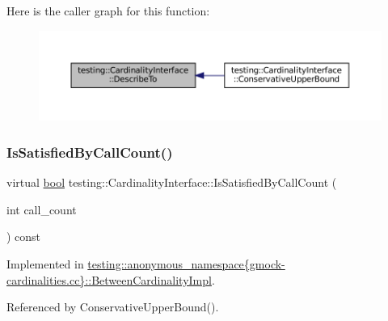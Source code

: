 Here is the caller graph for this function\+:
\nopagebreak
\begin{figure}[H]
\begin{center}
\leavevmode
\includegraphics[width=350pt]{classtesting_1_1CardinalityInterface_a8a93e3bbf24d14fe21186802ecef0929_icgraph}
\end{center}
\end{figure}
\mbox{\label{classtesting_1_1CardinalityInterface_af89684f4ea6d9de331abf7958754d8f1}} 
\subsubsection{\texorpdfstring{Is\+Satisfied\+By\+Call\+Count()}{IsSatisfiedByCallCount()}}
{\footnotesize\ttfamily virtual \hyperlink{classbool}{bool} testing\+::\+Cardinality\+Interface\+::\+Is\+Satisfied\+By\+Call\+Count (\begin{DoxyParamCaption}\item[{int}]{call\+\_\+count }\end{DoxyParamCaption}) const\hspace{0.3cm}{\ttfamily [pure virtual]}}



Implemented in \hyperlink{classtesting_1_1anonymous__namespace_02gmock-cardinalities_8cc_03_1_1BetweenCardinalityImpl_aba73001c6442fb7d37b4a11d92b8e9b8}{testing\+::anonymous\+\_\+namespace\{gmock-\/cardinalities.\+cc\}\+::\+Between\+Cardinality\+Impl}.



Referenced by Conservative\+Upper\+Bound().

